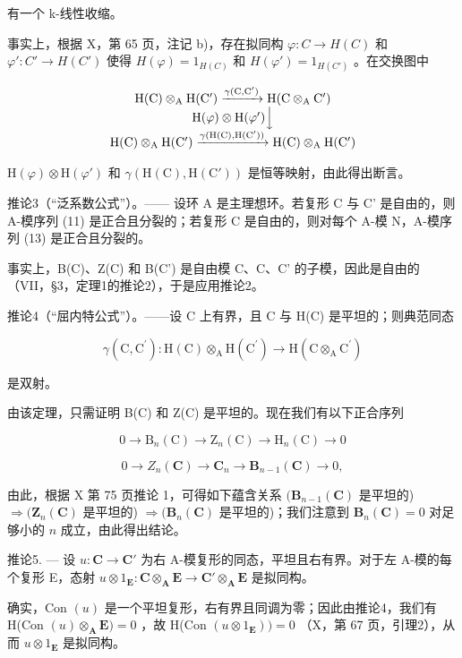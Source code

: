 有一个 k-线性收缩。

事实上，根据 X，第 65 页，注记 b)，存在拟同构 \(\varphi: C \to H(C)\) 和 \(\varphi': C' \to H(C')\) 使得 \(H(\varphi) = 1_{H(C)}\) 和 \(H(\varphi') = 1_{H(C')}\) 。在交换图中

\[
\begin{array}{c} \mathrm{H(C)} \otimes_ {\mathrm{A}} \mathrm {H(C^ {\prime})} \xrightarrow {\gamma (\mathrm{C,C} ^ {\prime})} \mathrm {H(C} \otimes_ {\mathrm{A}} \mathrm {C^ {\prime})} \\ \mathrm {H}(\varphi) \otimes \mathrm {H}(\varphi^ {\prime}) \Big \downarrow \\ \mathrm {H(C)} \otimes_ {\mathrm{A}} \mathrm {H(C^ {\prime})} \xrightarrow {\gamma (\mathrm{H(C),H(C^ {\prime})})} \mathrm {H(C)} \otimes_ {\mathrm{A}} \mathrm {H(C^ {\prime})} \end{array}
\]

\(\mathrm{H}(\varphi) \otimes \mathrm{H}(\varphi') \text{ 和 } \gamma(\mathrm{H}(\mathrm{C}), \mathrm{H}(\mathrm{C}') ) \text{ 是恒等映射，由此得出断言。}\)

推论3（“泛系数公式”）。—— 设环 A 是主理想环。若复形 C 与 C' 是自由的，则 A-模序列 (11) 是正合且分裂的；若复形 C 是自由的，则对每个 A-模 N，A-模序列 (13) 是正合且分裂的。

事实上，B(C)、Z(C) 和 B(C') 是自由模 C、C、C' 的子模，因此是自由的（VII，§3，定理1的推论2），于是应用推论2。

推论4（“屈内特公式”）。——设 C 上有界，且 C 与 H(C) 是平坦的；则典范同态

\[
\gamma (\mathrm{C}, \mathrm{C} ^ {\prime}): \mathrm{H} (\mathrm{C}) \otimes_ {\mathrm{A}} \mathrm{H} (\mathrm{C} ^ {\prime}) \rightarrow \mathrm{H} (\mathrm{C} \otimes_ {\mathrm{A}} \mathrm{C} ^ {\prime})
\]

是双射。

由该定理，只需证明 B(C) 和 Z(C) 是平坦的。现在我们有以下正合序列

\[
0 \to \mathrm{B} _ {n} (\mathrm{C}) \to \mathrm{Z} _ {n} (\mathrm{C}) \to \mathrm{H} _ {n} (\mathrm{C}) \to 0
\]

\[
0 \to Z _ {n} (\mathbf {C}) \to \mathbf {C} _ {n} \to \mathbf {B} _ {n - 1} (\mathbf {C}) \to 0,
\]

由此，根据 X 第 75 页推论 1，可得如下蕴含关系 \((\mathbf{B}_{n-1}(\mathbf{C})\) 是平坦的) \(\Rightarrow (\mathbf{Z}_n(\mathbf{C})\) 是平坦的) \(\Rightarrow (\mathbf{B}_n(\mathbf{C})\) 是平坦的)；我们注意到 \(\mathbf{B}_n(\mathbf{C}) = 0\) 对足够小的 \(n\) 成立，由此得出结论。

推论5. --- 设 \(u: \mathbf{C} \to \mathbf{C}'\) 为右 A-模复形的同态，平坦且右有界。对于左 A-模的每个复形 E，态射 \(u \otimes 1_{\mathbf{E}}: \mathbf{C} \otimes_{\mathbf{A}} \mathbf{E} \to \mathbf{C}' \otimes_{\mathbf{A}} \mathbf{E}\) 是拟同构。

确实，Con \((u)\) 是一个平坦复形，右有界且同调为零；因此由推论4，我们有 H(Con \((u) \otimes_{\mathbf{A}} \mathbf{E}) = 0\) ，故 H(Con \((u \otimes 1_{\mathbf{E}})) = 0\) （X，第 67 页，引理2），从而 \(u \otimes 1_{\mathbf{E}}\) 是拟同构。

